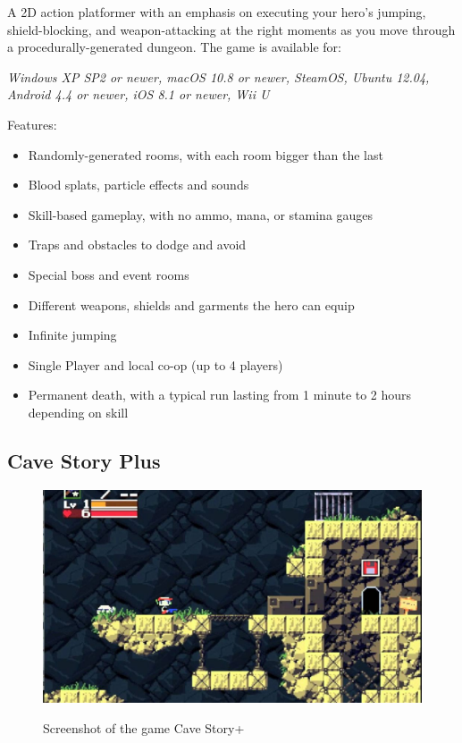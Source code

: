 \documentclass[12p]{article}
\begin{document}
A 2D action platformer with an emphasis on executing your hero's jumping, shield-blocking, and weapon-attacking at the right moments as you move through a procedurally-generated dungeon. The game is available for:

\emph{Windows XP SP2 or newer, macOS 10.8 or newer, SteamOS, Ubuntu 12.04, Android 4.4 or newer, iOS 8.1 or newer, Wii U}

Features:

\begin{itemize}
    \item Randomly-generated rooms, with each room bigger than the last
    \item Blood splats, particle effects and sounds
    \item Skill-based gameplay, with no ammo, mana, or stamina gauges
    \item Traps and obstacles to dodge and avoid
    \item Special boss and event rooms
    \item Different weapons, shields and garments the hero can equip
    \item Infinite jumping
    \item Single Player and local co-op (up to 4 players)
    \item Permanent death, with a typical run lasting from 1 minute to 2 hours depending on skill
\end{itemize}


\subsection{Cave Story Plus}

\begin{figure}[ht]
    \center
    \includegraphics[width=1\textwidth]{StateOfTheArtScreenshots/cave_story_plus}
    \label{StateOfTheArt_Screenshots_CaveStoryPlus}
    \caption{Screenshot of the game Cave Story+ \cite{CaveStoryPlusScreenshot}}
\end{figure}
\end{document}
